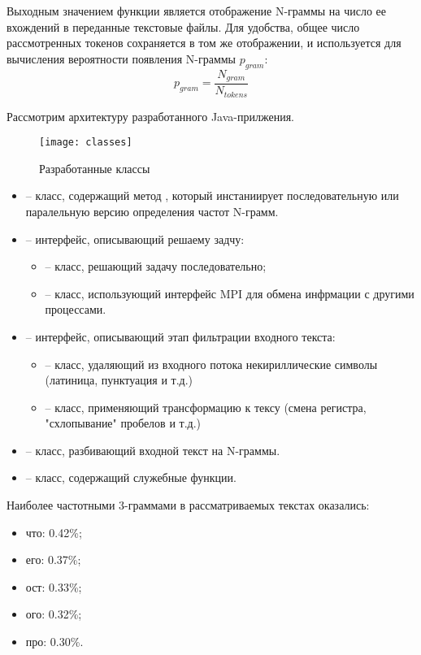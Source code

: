 Выходным значением функции является отображение N-граммы на число ее вхождений в переданные текстовые файлы. Для удобства, общее число рассмотренных токенов сохраняется в том же отображении, и используется для вычисления вероятности появления N-граммы $p_{gram}$:
$$
p_{gram} = \dfrac{N_{gram}}{N_{tokens}}
$$

Рассмотрим архитектуру разработанного Java-прилжения. 

\begin{figure}[H]
	\centering
	\texttt{[image: classes]}
	\caption{Разработанные классы}
\end{figure}

\begin{itemize}
	\item {} -- класс, содержащий метод , который инстаниирует последовательную или паралельную версию определения частот N-грамм.
	\item {} -- интерфейс, описывающий решаему задчу:
		\begin{itemize}
			\item {} -- класс, решающий задачу последовательно;
			\item {} -- класс, использующий интерфейс MPI для обмена инфрмации с другими процессами.
		\end{itemize}
	\item {} -- интерфейс, описывающий этап фильтрации входного текста:
		\begin{itemize}
			\item {} -- класс, удаляющий из входного потока некириллические символы (латиница, пунктуация и т.д.)
			\item {} -- класс, применяющий трансформацию к тексу (смена регистра, "схлопывание" пробелов и т.д.)
		\end{itemize}
	\item {} -- класс, разбивающий входной текст на N-граммы.
	\item {} -- класс, содержащий служебные функции.
\end{itemize}

\noindent Наиболее частотными 3-граммами в рассматриваемых текстах оказались:
\begin{itemize}
	\item что: 0.42\%;
	\item его: 0.37\%;
	\item ост: 0.33\%;
	\item ого: 0.32\%;
	\item про: 0.30\%.
\end{itemize} 

